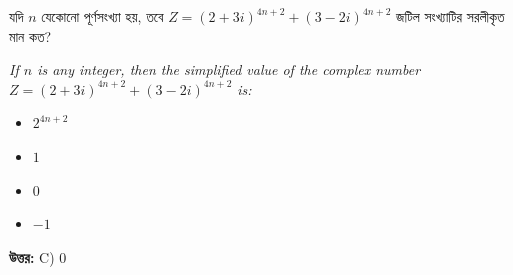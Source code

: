 \documentclass[12pt, a4paper]{article}
\begin{document}
\begin{tcolorbox}[questionbox={প্রশ্ন (Question) 12}]
    \noindent
    যদি $n$ যেকোনো পূর্ণসংখ্যা হয়, তবে $Z = (2+3i)^{4n+2} + (3-2i)^{4n+2}$ জটিল সংখ্যাটির সরলীকৃত মান কত?
    
    \vspace{0.8em}
    \begin{english}
    \noindent\textit{\color{darkgray}
    If $n$ is any integer, then the simplified value of the complex number $Z = (2+3i)^{4n+2} + (3-2i)^{4n+2}$ is:
    }
    \end{english}
\end{tcolorbox}

\begin{itemize}[label={}, leftmargin=1cm, itemsep=0.5em]
    \item[\textbf{A)}] $2^{4n+2}$
    \item[\textbf{B)}] $1$
    \item[\textbf{C)}] $0$
    \item[\textbf{D)}] $-1$
\end{itemize}

\vspace{0.5em}
\begin{tcolorbox}[answerbox]
    \textbf{\color{success} উত্তর:} C) $0$
\end{tcolorbox}
\vspace{1em}
\end{document}
